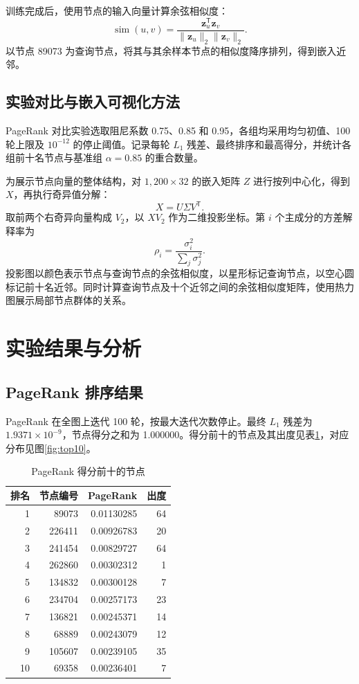 \documentclass[UTF8,a4paper,12pt,fontset=windows]{ctexart}
\begin{document}
训练完成后，使用节点的输入向量计算余弦相似度：
\begin{equation}
\operatorname{sim}(u,v)=\frac{\mathbf{z}_u^{\mathsf T}\mathbf{z}_v}{\|\mathbf{z}_u\|_2\|\mathbf{z}_v\|_2}.
\end{equation}
以节点 89073 为查询节点，将其与其余样本节点的相似度降序排列，得到嵌入近邻。


\subsection{实验对比与嵌入可视化方法}
PageRank 对比实验选取阻尼系数 0.75、0.85 和 0.95，各组均采用均匀初值、100 轮上限及 $10^{-12}$ 的停止阈值。记录每轮 $L_1$ 残差、最终排序和最高得分，并统计各组前十名节点与基准组 $\alpha=0.85$ 的重合数量。

为展示节点向量的整体结构，对 $1{,}200\times32$ 的嵌入矩阵 $Z$ 进行按列中心化，得到 $X$，再执行奇异值分解：
\begin{equation}
X=U\Sigma V^{\mathsf T}.
\end{equation}
取前两个右奇异向量构成 $V_2$，以 $XV_2$ 作为二维投影坐标。第 $i$ 个主成分的方差解释率为
\begin{equation}
\rho_i=\frac{\sigma_i^2}{\sum_j\sigma_j^2}.
\end{equation}
投影图以颜色表示节点与查询节点的余弦相似度，以星形标记查询节点，以空心圆标记前十名近邻。同时计算查询节点及十个近邻之间的余弦相似度矩阵，使用热力图展示局部节点群体的关系。

\section{实验结果与分析}
\subsection{PageRank 排序结果}
PageRank 在全图上迭代 100 轮，按最大迭代次数停止。最终 $L_1$ 残差为 $1.9371\times10^{-9}$，节点得分之和为 1.000000。得分前十的节点及其出度见表\ref{tab:pr}，对应分布见图\ref{fig:top10}。

\begin{table}[H]
\centering
\caption{PageRank 得分前十的节点}\label{tab:pr}
\begin{tabular}{rrrr}
\toprule
排名 & 节点编号 & PageRank & 出度\\
\midrule
1 & 89073 & 0.01130285 & 64\\
2 & 226411 & 0.00926783 & 20\\
3 & 241454 & 0.00829727 & 64\\
4 & 262860 & 0.00302312 & 1\\
5 & 134832 & 0.00300128 & 7\\
6 & 234704 & 0.00257173 & 23\\
7 & 136821 & 0.00245371 & 14\\
8 & 68889 & 0.00243079 & 12\\
9 & 105607 & 0.00239105 & 35\\
10 & 69358 & 0.00236401 & 7\\
\bottomrule
\end{tabular}
\end{table}
\end{document}
